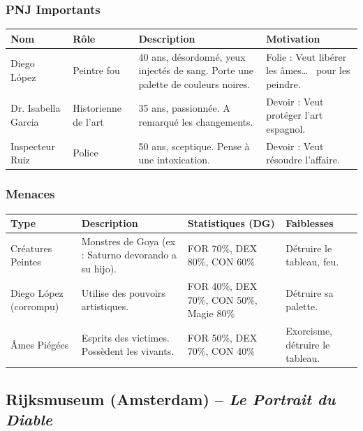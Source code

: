 \documentclass[10pt,a5paper,twoside]{book}
\begin{document}
\newpage

\subsubsection*{PNJ Importants}
\begin{center}
	\begin{tabular}{|P{2cm}|P{3cm}|P{3.5cm}|P{2.5cm}|}
	\hline
	\textbf{Nom} 			& \textbf{Rôle} 		& \textbf{Description} 									& \textbf{Motivation} \\ \hline
	Diego López 			& Peintre fou 			& 40 ans, désordonné, yeux injectés de sang. Porte une palette de couleurs noires. 	& Folie : Veut libérer les âmes\ldots~  pour les peindre. \\ \hline
	Dr. Isabella Garcia 	& Historienne de l'art 	& 35 ans, passionnée. A remarqué les changements. 		& Devoir : Veut protéger l'art espagnol. \\ \hline
	Inspecteur Ruiz 		& Police 				& 50 ans, sceptique. Pense à une intoxication. 			& Devoir : Veut résoudre l'affaire. \\ \hline
	\end{tabular}
\end{center}

\subsubsection*{Menaces}
\begin{center}
	\begin{tabular}{|P{2cm}|P{3cm}|P{3.5cm}|P{2.5cm}|}
	\hline
	\textbf{Type} 			& \textbf{Description} 									& \textbf{Statistiques (DG)} 				& \textbf{Faiblesses} \\ \hline
	Créatures Peintes 		& Monstres de Goya (ex : Saturno devorando a su hijo). 	& FOR 70\%, DEX 80\%, CON 60\% 				& Détruire le tableau, feu. \\ \hline
	Diego López (corrompu) 	& Utilise des pouvoirs artistiques. 					& FOR 40\%, DEX 70\%, CON 50\%, Magie 80\% 	& Détruire sa palette. \\ \hline
	Âmes Piégées 			& Esprits des victimes. Possèdent les vivants. 			& FOR 50\%, DEX 70\%, CON 40\% 				& Exorcisme, détruire le tableau. \\ \hline
	\end{tabular}
\end{center}

\newpage

\subsection{Rijksmuseum (Amsterdam) -- \newline \textit{Le Portrait du Diable}}
\end{document}
